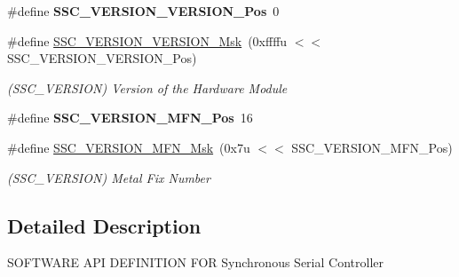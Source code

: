 \begin{DoxyCompactItemize}
\#define {\bfseries S\+S\+C\+\_\+\+V\+E\+R\+S\+I\+O\+N\+\_\+\+V\+E\+R\+S\+I\+O\+N\+\_\+\+Pos}~0
\item 
\mbox{\label{group__SAMV71__SSC_ga0da81f469a8d1223acfecccd671ebde7}} 
\#define \mbox{\hyperlink{group__SAMV71__SSC_ga0da81f469a8d1223acfecccd671ebde7}{S\+S\+C\+\_\+\+V\+E\+R\+S\+I\+O\+N\+\_\+\+V\+E\+R\+S\+I\+O\+N\+\_\+\+Msk}}~(0xffffu $<$$<$ S\+S\+C\+\_\+\+V\+E\+R\+S\+I\+O\+N\+\_\+\+V\+E\+R\+S\+I\+O\+N\+\_\+\+Pos)
\begin{DoxyCompactList}\small\item\em (S\+S\+C\+\_\+\+V\+E\+R\+S\+I\+ON) Version of the Hardware Module \end{DoxyCompactList}\item 
\mbox{\label{group__SAMV71__SSC_ga6e3d40acea9c31e8aa6eae23eb020d1f}} 
\#define {\bfseries S\+S\+C\+\_\+\+V\+E\+R\+S\+I\+O\+N\+\_\+\+M\+F\+N\+\_\+\+Pos}~16
\item 
\mbox{\label{group__SAMV71__SSC_ga2c8d98c82d254f07c306ec4618901394}} 
\#define \mbox{\hyperlink{group__SAMV71__SSC_ga2c8d98c82d254f07c306ec4618901394}{S\+S\+C\+\_\+\+V\+E\+R\+S\+I\+O\+N\+\_\+\+M\+F\+N\+\_\+\+Msk}}~(0x7u $<$$<$ S\+S\+C\+\_\+\+V\+E\+R\+S\+I\+O\+N\+\_\+\+M\+F\+N\+\_\+\+Pos)
\begin{DoxyCompactList}\small\item\em (S\+S\+C\+\_\+\+V\+E\+R\+S\+I\+ON) Metal Fix Number \end{DoxyCompactList}\end{DoxyCompactItemize}


\subsection{Detailed Description}
S\+O\+F\+T\+W\+A\+RE A\+PI D\+E\+F\+I\+N\+I\+T\+I\+ON F\+OR Synchronous Serial Controller 
